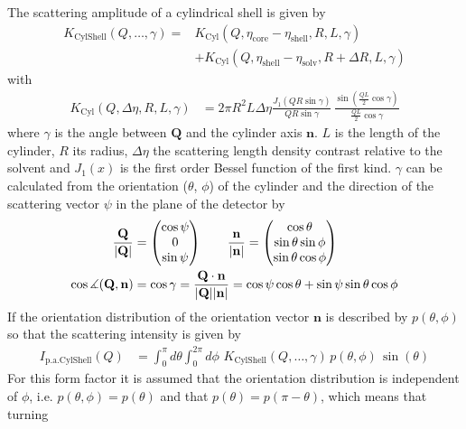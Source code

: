 \noindent The scattering amplitude of a cylindrical shell is given by
\begin{align}
K_\text{CylShell}\left(Q,\dots,\gamma\right)  = &K_\text{Cyl}\left(Q,\eta_\text{core}-\eta_\text{shell},R,L,\gamma\right) \\
& +  K_\text{Cyl}\left(Q,\eta_\text{shell}-\eta_\text{solv},R+\Delta
R,L,\gamma\right)
\end{align}
with
\begin{align}
K_\text{Cyl}(Q,\Delta\eta,R,L,\gamma) & = 2 \pi R^2 L \Delta \eta
    \frac{J_1\left(Q R \sin\gamma\right)}{Q R \sin\gamma} \,
    \frac{\sin\left(\frac{QL}{2} \cos\gamma\right)}{\frac{QL}{2} \cos\gamma}
\end{align}
where $\gamma$ is the angle between $\mathbf{Q}$ and the cylinder
axis $\mathbf{n}$. $L$ is the length of the cylinder, $R$ its
radius, $\Delta\eta$ the scattering length density contrast relative
to the solvent and $J_1(x)$ is the first order Bessel function of
the first kind. $\gamma$ can be calculated from the orientation
($\theta$, $\phi$) of the cylinder and the direction of the
scattering vector $\psi$ in the plane of the detector by
\begin{align}
\frac{\mathbf{Q}}{\abs{\mathbf{Q}}} &=
\begin{pmatrix}
\cos \psi \\
0  \\
\sin \psi
\end{pmatrix} \qquad
\frac{\mathbf{n}}{\abs{\mathbf{n}}} =
\begin{pmatrix}
\cos \theta \\
\sin \theta \sin \phi  \\
\sin \theta \cos \phi
\end{pmatrix} \\
\cos \measuredangle(\mathbf{Q,n}) &= \cos \gamma = \frac{\mathbf{Q\cdot
n}}{\abs{\mathbf{Q}}\abs{\mathbf{n}}} = \cos\psi \cos\theta +
\sin\psi \sin\theta \cos\phi
\end{align}
If the orientation distribution of the orientation vector $\mathbf{n}$ is described by $p(\theta,\phi)$
so that the scattering intensity is given by
\begin{align}
I_\mathrm{p.a.CylShell}(Q) & =
            \int_0^\pi d\theta \int_0^{2\pi} d\phi \, \,
                K_\text{CylShell}\left(Q,\dots,\gamma\right)\,p(\theta,\phi)\,\sin(\theta)
\end{align}
For this form factor it is assumed that the orientation distribution is independent of $\phi$,
i.e. $p(\theta,\phi)=p(\theta)$ and that $p(\theta)=p(\pi-\theta)$, which means that turning

